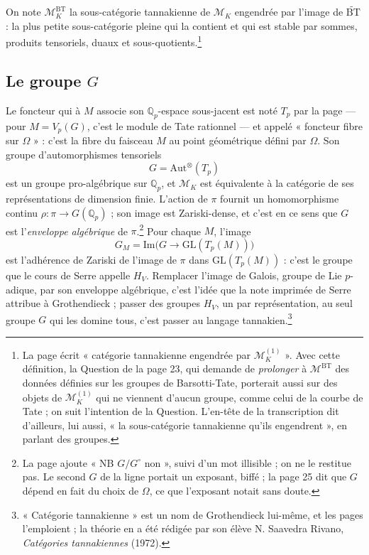 \documentclass[11pt,a4paper]{article}
\begin{document}
On note $\mathcal{M}^{\mathrm{BT}}_K$ la sous-catégorie tannakienne de
$\mathcal{M}_K$ engendrée par l'image de $\widetilde{\mathrm{BT}}$ : la plus
petite sous-catégorie pleine qui la contient et qui est stable par sommes,
produits tensoriels, duaux et sous-quotients.\footnote{La page écrit
« catégorie tannakienne engendrée par $\mathcal{M}^{(1)}_K$ ». Avec cette
définition, la Question de la page 23, qui demande de \emph{prolonger} à
$\mathcal{M}^{\mathrm{BT}}$ des données définies sur les groupes de
Barsotti-Tate, porterait aussi sur des objets de $\mathcal{M}^{(1)}_K$ qui ne
viennent d'aucun groupe, comme celui de la courbe de Tate ; on suit l'intention
de la Question. L'en-tête de la transcription dit d'ailleurs, lui aussi, « la
sous-catégorie tannakienne qu'ils engendrent », en parlant des groupes.}

\subsection*{Le groupe $G$}

Le foncteur qui à $M$ associe son $\mathbb{Q}_p$-espace sous-jacent est noté
$T_p$ par la page --- pour $M = V_p(G)$, c'est le module de Tate rationnel ---
et appelé « foncteur fibre sur $\Omega$ » : c'est la fibre du faisceau $M$ au
point géométrique défini par $\Omega$. Son groupe d'automorphismes tensoriels
\[
G = \mathrm{Aut}^{\otimes}(T_p)
\]
est un groupe pro-algébrique sur $\mathbb{Q}_p$, et $\mathcal{M}_K$ est
équivalente à la catégorie de ses représentations de dimension finie. L'action
de $\pi$ fournit un homomorphisme continu $\rho : \pi \to G(\mathbb{Q}_p)$ ;
son image est Zariski-dense, et c'est en ce sens que $G$ est l'\emph{enveloppe
algébrique} de $\pi$.\footnote{La page ajoute « NB $G/G^{\circ}$ non », suivi
d'un mot illisible ; on ne le restitue pas. Le second $G$ de la ligne portait
un exposant, biffé ; la page 25 dit que $G$ dépend en fait du choix de
$\Omega$, ce que l'exposant notait sans doute.} Pour chaque $M$, l'image
\[
G_M = \mathrm{Im}\bigl(G \to \mathrm{GL}(T_p(M))\bigr)
\]
est l'adhérence de Zariski de l'image de $\pi$ dans $\mathrm{GL}(T_p(M))$ :
c'est le groupe que le cours de Serre appelle $H_V$. Remplacer l'image de
Galois, groupe de Lie $p$-adique, par son enveloppe algébrique, c'est l'idée
que la note imprimée de Serre attribue à Grothendieck ; passer des groupes
$H_V$, un par représentation, au seul groupe $G$ qui les domine tous, c'est
passer au langage tannakien.\footnote{« Catégorie
tannakienne » est un nom de Grothendieck lui-même, et les pages l'emploient ;
la théorie en a été rédigée par son élève N. Saavedra Rivano,
\emph{Catégories tannakiennes} (1972).}
\end{document}
